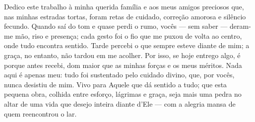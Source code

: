 \begin{dedicatoria}
   \vspace*{\fill}

{%
	\noindent\hspace{.5\textwidth}
	{\begin{minipage}{.5\textwidth}
			Dedico este trabalho à minha querida família e aos meus amigos preciosos que, nas minhas estradas tortas, foram retas de cuidado, correção amorosa e silêncio fecundo. Quando saí do tom e quase perdi o rumo, vocês — sem saber — deram-me mão, riso e presença; cada gesto foi o fio que me puxou de volta ao centro, onde tudo encontra sentido. Tarde percebi o que sempre esteve diante de mim; a graça, no entanto, não tardou em me acolher. Por isso, se hoje entrego algo, é porque antes recebi, dom maior que as minhas forças e os meus méritos. Nada aqui é apenas meu: tudo foi sustentado pelo cuidado divino, que, por vocês, nunca desistiu de mim. Vivo para Aquele que dá sentido a tudo; que esta pequena obra, colhida entre esforço, lágrimas e graça, seja mais uma pedra no altar de uma vida que desejo inteira diante d’Ele — com a alegria mansa de quem reencontrou o lar.
	\end{minipage}}%
\vspace*{3cm}
}%

\end{dedicatoria}

